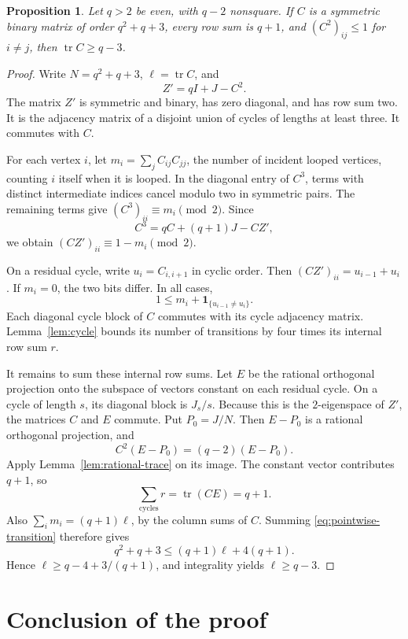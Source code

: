 \documentclass[11pt,reqno]{amsart}
\newtheorem{proposition}[theorem]{Proposition}
\theoremstyle{definition}
\theoremstyle{remark}
\numberwithin{equation}{section}
\DeclareMathOperator{\tr}{tr}
\begin{document}
\begin{proposition}\label{prop:trace}
Let $q>2$ be even, with $q-2$ nonsquare. If $C$ is a symmetric binary
matrix of order $q^2+q+3$, every row sum is $q+1$, and
$(C^2)_{ij}\le1$ for $i\ne j$, then $\tr C\ge q-3$.
\end{proposition}
\begin{proof}
Write $N=q^2+q+3$, $\ell=\tr C$, and
\[
 Z'=qI+J-C^2.
\]
The matrix $Z'$ is symmetric and binary, has zero diagonal, and has
row sum two. It is the adjacency matrix of a disjoint union of cycles
of lengths at least three. It commutes with $C$.

For each vertex $i$, let
$m_i=\sum_j C_{ij}C_{jj}$, the number of incident looped vertices,
counting $i$ itself when it is looped. In the diagonal entry of $C^3$,
terms with distinct intermediate indices cancel modulo two in symmetric
pairs. The remaining terms give $(C^3)_{ii}\equiv m_i\pmod2$.
Since
\[
 C^3=qC+(q+1)J-CZ',
\]
we obtain $(CZ')_{ii}\equiv1-m_i\pmod2$.

On a residual cycle, write $u_i=C_{i,i+1}$ in cyclic order.
Then $(CZ')_{ii}=u_{i-1}+u_i$. If $m_i=0$, the two bits differ.
In all cases,
\begin{equation}\label{eq:pointwise-transition}
 1\le m_i+\mathbf1_{\{u_{i-1}\ne u_i\}}.
\end{equation}
Each diagonal cycle block of $C$ commutes with its cycle adjacency
matrix. Lemma~\ref{lem:cycle} bounds its number of transitions by four
times its internal row sum $r$.

It remains to sum these internal row sums. Let $E$ be the rational
orthogonal projection onto the subspace of vectors constant on each
residual cycle. On a cycle of length $s$, its diagonal block is $J_s/s$.
Because this is the $2$-eigenspace of $Z'$, the matrices $C$ and $E$
commute. Put $P_0=J/N$. Then $E-P_0$ is a rational orthogonal
projection, and
\[
 C^2(E-P_0)=(q-2)(E-P_0).
\]
Apply Lemma~\ref{lem:rational-trace} on its image. The constant vector
contributes $q+1$, so
\[
 \sum_{\text{cycles}}r=\tr(CE)=q+1.
\]
Also $\sum_i m_i=(q+1)\ell$, by the column sums of $C$.
Summing \eqref{eq:pointwise-transition} therefore gives
\[
 q^2+q+3\le(q+1)\ell+4(q+1).
\]
Hence $\ell\ge q-4+3/(q+1)$, and integrality yields $\ell\ge q-3$.
\end{proof}

\section{Conclusion of the proof}
\end{document}
